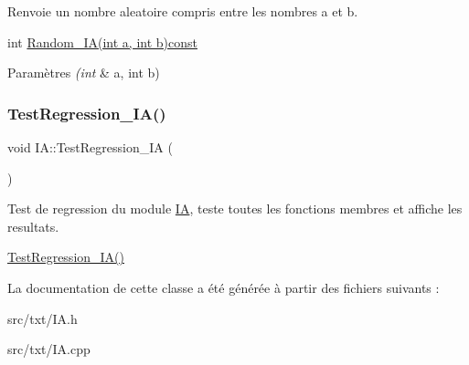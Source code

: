 Renvoie un nombre aleatoire compris entre les nombres a et b. 

int \hyperlink{classIA_a7e9db872f7a4ff8bf955fa46be231bad}{Random\+\_\+\+I\+A(int a, int b)const} 
\begin{DoxyParams}{Paramètres}
{\em (int} & a, int b) \\
\hline
\end{DoxyParams}
\mbox{\label{classIA_ab5b3e7808c172f2004f3f15c720afed5}} 
\subsubsection{\texorpdfstring{Test\+Regression\+\_\+\+I\+A()}{TestRegression\_IA()}}
{\footnotesize\ttfamily void I\+A\+::\+Test\+Regression\+\_\+\+IA (\begin{DoxyParamCaption}{ }\end{DoxyParamCaption})}



Test de regression du module \hyperlink{classIA}{IA}, teste toutes les fonctions membres et affiche les resultats. 

\hyperlink{classIA_ab5b3e7808c172f2004f3f15c720afed5}{Test\+Regression\+\_\+\+I\+A()} 

La documentation de cette classe a été générée à partir des fichiers suivants \+:\begin{DoxyCompactItemize}
\item 
src/txt/I\+A.\+h\item 
src/txt/I\+A.\+cpp\end{DoxyCompactItemize}
